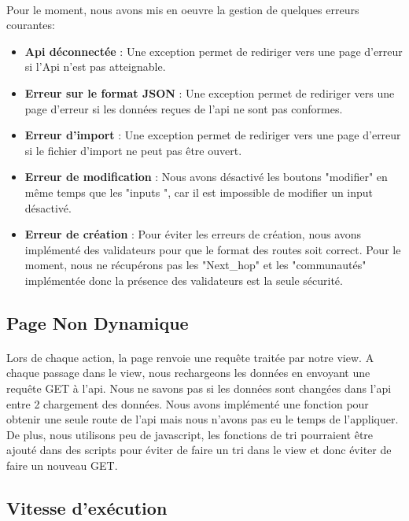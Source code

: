 \paragraph{}Pour le moment, nous avons mis en oeuvre la gestion de quelques erreurs courantes:
\begin{itemize}
    \item \textbf{Api déconnectée} : Une exception permet de rediriger vers une page d'erreur si l'Api n'est pas atteignable.%
    \item \textbf{Erreur sur le format JSON} : Une exception permet de rediriger vers une page d'erreur si les données reçues de l'api ne sont pas conformes.%
    \item \textbf{Erreur d'import} : Une exception permet de rediriger vers une page d'erreur si le fichier d'import ne peut pas être ouvert.%
    \item \textbf{Erreur de modification} : Nous avons désactivé les boutons "modifier" en même temps que les "inputs ", car il est impossible de modifier un input désactivé. %
    \item \textbf{Erreur de création} : Pour éviter les erreurs de création, nous avons implémenté des validateurs pour que le format des routes soit correct.%
    Pour le moment, nous ne récupérons pas les "Next\_hop" et les "communautés" implémentée donc la présence des validateurs est la seule sécurité.%
\end{itemize}

\subsection{Page Non Dynamique}
\paragraph{}Lors de chaque action, la page renvoie une requête traitée par notre view. A chaque passage dans le view, nous rechargeons les données en envoyant une requête GET à l'api. Nous ne savons pas si les données sont changées dans l'api entre 2 chargement des données. Nous avons implémenté une fonction pour obtenir une seule route de l'api mais nous n'avons pas eu le temps de l'appliquer.
De plus, nous utilisons peu de javascript, les fonctions de tri pourraient être ajouté dans des scripts pour éviter de faire un tri dans le view et donc éviter de faire un nouveau GET. 

\subsection{Vitesse d'exécution}
